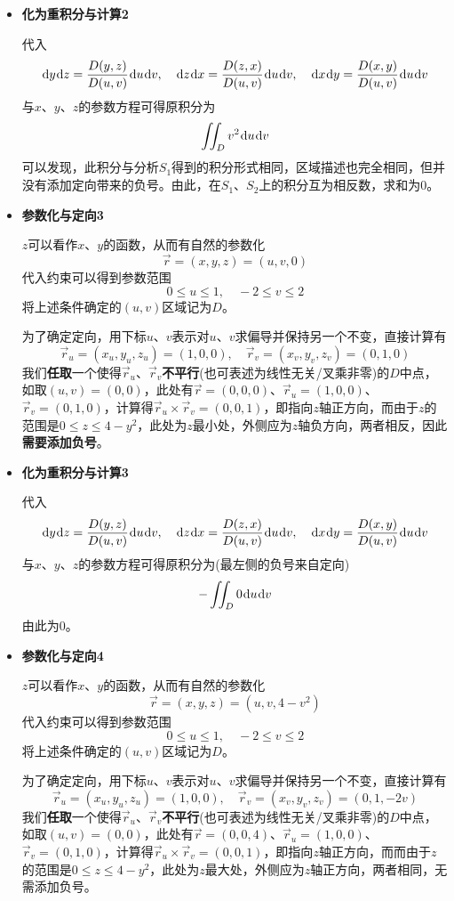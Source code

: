 \documentclass[a4paper,UTF8,fontset=windows,AutoFakeBold]{ctexart}
\newcommand*{\dr}{\hspace{0.07em}\mathrm{d}}
\newcommand*{\rv}{\vec{r}}
\theoremstyle{ex}
\begin{document}
\begin{enumerate}
{\begin{itemize}
            \item \textbf{化为重积分与计算2}
            
            代入
            $$\dr y\dr z=\frac{D(y,z)}{D(u,v)}\dr u\dr v,\quad\dr z\dr x=\frac{D(z,x)}{D(u,v)}\dr u\dr v,\quad\dr x\dr y=\frac{D(x,y)}{D(u,v)}\dr u\dr v$$
            与$x$、$y$、$z$的参数方程可得原积分为
            $$\iint_Dv^2\dr u\dr v$$
            可以发现，此积分与分析$S_1$得到的积分形式相同，区域描述也完全相同，但并没有添加定向带来的负号。由此，在$S_1$、$S_2$上的积分互为相反数，求和为0。

            \item \textbf{参数化与定向3}
            
            $z$可以看作$x$、$y$的函数，从而有自然的参数化
            $$\vec{r}=(x,y,z)=(u,v,0)$$
            代入约束可以得到参数范围
            $$0\le u\le 1,\quad -2\le v\le 2$$
            将上述条件确定的$(u,v)$区域记为$D$。

            为了确定定向，用下标$u$、$v$表示对$u$、$v$求偏导并保持另一个不变，直接计算有
            $$\rv_u=(x_u,y_u,z_u)=(1,0,0),\quad\rv_v=(x_v,y_v,z_v)=(0,1,0)$$
            我们\textbf{任取}一个使得$\rv_u$、$\rv_v$\textbf{不平行}(也可表述为线性无关/叉乘非零)的$D$中点，如取$(u,v)=(0,0)$，此处有$\rv=(0,0,0)$、$\rv_u=(1,0,0)$、$\rv_v=(0,1,0)$，计算得$\rv_u\times\rv_v=(0,0,1)$，即指向$z$轴正方向，而由于$z$的范围是$0\le z\le4-y^2$，此处为$z$最小处，外侧应为$z$轴负方向，两者相反，因此\textbf{需要添加负号}。

            \item \textbf{化为重积分与计算3}
            
            代入
            $$\dr y\dr z=\frac{D(y,z)}{D(u,v)}\dr u\dr v,\quad\dr z\dr x=\frac{D(z,x)}{D(u,v)}\dr u\dr v,\quad\dr x\dr y=\frac{D(x,y)}{D(u,v)}\dr u\dr v$$
            与$x$、$y$、$z$的参数方程可得原积分为(最左侧的负号来自定向)
            $$-\iint_D0\dr u\dr v$$
            由此为0。

            \item \textbf{参数化与定向4}
            
            $z$可以看作$x$、$y$的函数，从而有自然的参数化
            $$\vec{r}=(x,y,z)=(u,v,4-v^2)$$
            代入约束可以得到参数范围
            $$0\le u\le 1,\quad -2\le v\le 2$$
            将上述条件确定的$(u,v)$区域记为$D$。

            为了确定定向，用下标$u$、$v$表示对$u$、$v$求偏导并保持另一个不变，直接计算有
            $$\rv_u=(x_u,y_u,z_u)=(1,0,0),\quad\rv_v=(x_v,y_v,z_v)=(0,1,-2v)$$
            我们\textbf{任取}一个使得$\rv_u$、$\rv_v$\textbf{不平行}(也可表述为线性无关/叉乘非零)的$D$中点，如取$(u,v)=(0,0)$，此处有$\rv=(0,0,4)$、$\rv_u=(1,0,0)$、$\rv_v=(0,1,0)$，计算得$\rv_u\times\rv_v=(0,0,1)$，即指向$z$轴正方向，而而由于$z$的范围是$0\le z\le4-y^2$，此处为$z$最大处，外侧应为$z$轴正方向，两者相同，无需添加负号。


\end{itemize}}
\end{enumerate}
\end{document}
